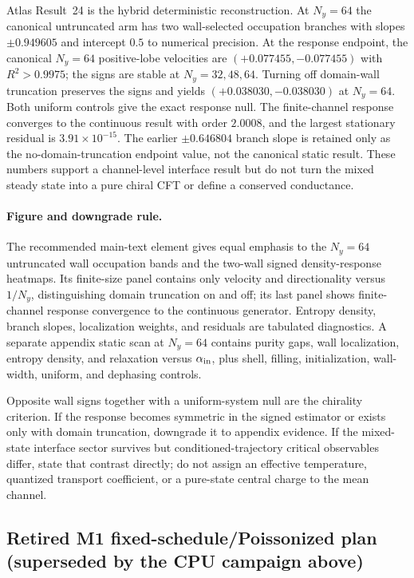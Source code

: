 \documentclass[aps,prx,twocolumn,floatfix,nofootinbib,superscriptaddress,longbibliography]{revtex4-2}
\begin{document}
Atlas Result~24 is the hybrid deterministic reconstruction.  At $N_y=64$ the canonical
untruncated arm has two wall-selected occupation branches with slopes
$\pm0.949605$ and intercept $0.5$ to numerical precision.  At the response endpoint, the
canonical $N_y=64$ positive-lobe velocities are
$(+0.077455,-0.077455)$ with $R^2>0.9975$; the signs are stable at $N_y=32,48,64$.
Turning off domain-wall truncation preserves the signs and yields
$(+0.038030,-0.038030)$ at $N_y=64$.  Both uniform controls give the exact response null.
The finite-channel response converges to the continuous result with order $2.0008$, and
the largest stationary residual is $3.91\times10^{-15}$.  The earlier
$\pm0.646804$ branch slope is retained only as the no-domain-truncation endpoint value,
not the canonical static result.  These numbers support a channel-level interface result
but do not turn the mixed steady state into a pure chiral CFT or define a conserved
conductance.

\paragraph*{Figure and downgrade rule.}
The recommended main-text element gives equal emphasis to the $N_y=64$ untruncated wall
occupation bands and the two-wall signed density-response heatmaps.  Its finite-size panel
contains only velocity and directionality versus $1/N_y$, distinguishing domain
truncation on and off; its last panel shows finite-channel response convergence to the
continuous generator.  Entropy density, branch slopes, localization weights, and
residuals are tabulated diagnostics.  A separate appendix static scan at $N_y=64$ contains
purity gaps, wall localization, entropy density, and relaxation versus $\alpha_{\rm in}$,
plus shell, filling, initialization, wall-width, uniform, and dephasing controls.

Opposite wall signs together with a uniform-system null are the chirality criterion.  If
the response becomes symmetric in the signed estimator or exists only with domain
truncation, downgrade it to appendix evidence.  If the mixed-state interface sector
survives but conditioned-trajectory critical observables differ, state that contrast
directly; do not assign an effective temperature, quantized transport coefficient, or a
pure-state central charge to the mean channel.

\iffalse
\subsection{Retired M1 fixed-schedule/Poissonized plan (superseded by the CPU campaign above)}
\end{document}
